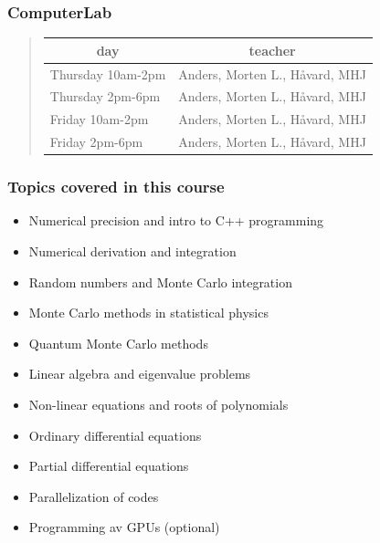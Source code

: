 \documentclass{beamer}
\newenvironment{block_mdfboxadmon}[1][]{\begin{block}{#1}}{\end{block}}
\begin{document}
\begin{frame}
\frametitle{ComputerLab}

\begin{block_mdfboxadmon}[]


\begin{quote}
\begin{tabular}{ll}
\hline
\multicolumn{1}{c}{ day } & \multicolumn{1}{c}{ teacher } \\
\hline
Thursday 10am-2pm               & Anders, Morten L., Håvard, MHJ \\
Thursday 2pm-6pm                & Anders, Morten L., Håvard, MHJ \\
Friday 10am-2pm                 & Anders, Morten L., Håvard, MHJ \\
Friday 2pm-6pm                  & Anders, Morten L., Håvard, MHJ \\
\hline
\end{tabular}
\end{quote}

\noindent
\end{block_mdfboxadmon}
\end{frame}

\begin{frame}
\frametitle{Topics covered in this course}

\begin{block_mdfboxadmon}[]
\begin{itemize}
  \item Numerical precision and intro to C++ programming

  \item Numerical derivation and integration

  \item Random numbers and Monte Carlo integration

  \item Monte Carlo methods in statistical physics

  \item Quantum Monte Carlo methods

  \item Linear algebra and eigenvalue problems

  \item Non-linear equations and roots of polynomials

  \item Ordinary differential equations

  \item Partial differential equations

  \item Parallelization of codes

  \item Programming av GPUs (optional)
\end{itemize}

\noindent
\end{block_mdfboxadmon}
\end{frame}
\end{document}
